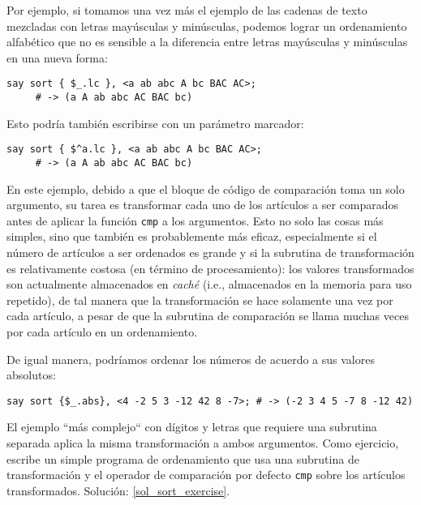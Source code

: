 Por ejemplo, si tomamos una vez más el ejemplo de las cadenas
de texto mezcladas con letras mayúsculas y minúsculas, 
podemos lograr un ordenamiento alfabético que no es 
sensible a la diferencia entre letras mayúsculas y minúsculas
en una nueva forma:

\begin{lstlisting}
say sort { $_.lc }, <a ab abc A bc BAC AC>;
     # -> (a A ab abc AC BAC bc)
\end{lstlisting}

Esto podría también escribirse con un parámetro marcador:

\begin{lstlisting}
say sort { $^a.lc }, <a ab abc A bc BAC AC>;
     # -> (a A ab abc AC BAC bc)
\end{lstlisting}

En este ejemplo, debido a que el bloque de código
de comparación toma un solo argumento, su tarea es
transformar cada uno de los artículos a ser comparados
antes de aplicar la función {\tt cmp}  a los argumentos.
Esto no solo las cosas más simples, sino que también
es probablemente más eficaz, especialmente si 
el número de artículos a ser ordenados es grande y si
la subrutina de transformación es relativamente costosa
(en término de procesamiento): los valores transformados
son actualmente almacenados en \emph{caché} (i.e.,
almacenados en la memoria para uso repetido), de tal manera
que la transformación se hace solamente una vez por cada artículo,
a pesar de que la subrutina de comparación se llama muchas veces por
cada artículo en un ordenamiento.

De igual manera, podríamos ordenar los números de acuerdo 
a sus valores absolutos:

\begin{lstlisting}
say sort {$_.abs}, <4 -2 5 3 -12 42 8 -7>; # -> (-2 3 4 5 -7 8 -12 42)
\end{lstlisting}

El ejemplo ``más complejo`` con dígitos y letras que requiere
una subrutina separada aplica la misma transformación
a ambos argumentos. Como ejercicio, escribe un simple programa
de ordenamiento que usa una subrutina de transformación y
el operador de comparación por defecto {\tt cmp} sobre
los artículos transformados. Solución: \ref{sol_sort_exercise}.
\label{sort_exercise}

